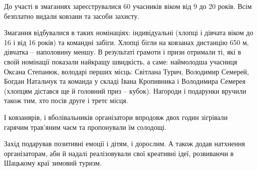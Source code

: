 \begin{zznagolos}
До участі в змаганнях зареєструвалися 60 учасників віком від 9 до 20 років.
Всім безплатно видали ковзани та засоби захисту.	
\end{zznagolos}

Змагання відбувалися в таких номінаціях: індивідуальні (хлопці і дівчата віком
до 16 і від 16 років) та командні забіги. Хлопці бігли на ковзанах дистанцію
650 м, дівчатка – наполовину меншу. В результаті грамоти і призи отримали ті,
які в своїй номінації показали найкращу швидкість, а саме: наймолодша учасниця
Оксана Степанюк, володарі перших місць: Світлана Турич, Володимир Семерей,
Богдан Натальчук та команда у складі Івана Кропивника і Володимира Семерея
(хлопцям дістався ще й головний приз – кубок). Нагороди і подарунки вручили
також тим, хто посів друге і третє місця.

І ковзанярів, і вболівальників організатори впродовж двох годин зігрівали
гарячим трав’яним чаєм та пропонували їм солодощі.

Захід подарував позитивні емоції і дітям, і дорослим. А також додав натхнення
організаторам, аби й надалі реалізовували свої креативні ідеї, розвиваючи в
Шацькому краї зимовий туризм.

